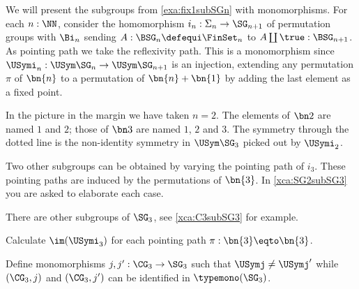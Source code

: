 \begin{example}
  \label{ex:SGninSGn+1}
We will present the subgroups from \cref{exa:fix1subSGn} with
monomorphisms. For each $n:\NN$, consider the  homomorphism 
$i_n:\Sigma_n\to\SG_{n+1}$ of permutation groups
with $\Bi_n$ sending $A:\BSG_n\defequi \FinSet_n$ to $A\coprod\true:\BSG_{n+1}$.
As pointing path we take the reflexivity path.
This is a monomorphism since $\USymi_n:\USym\SG_n\to\USym\SG_{n+1}$ 
is an injection, extending any permutation $\pi$ of $\bn{n}$ to 
a permutation of $\bn{n}+\bn{1}$ by adding the last element as a
fixed point.

In the picture in the margin we have taken $n=2$. The elements of $\bn 2$ are
named $1$ and $2$; those of $\bn 3$ are named $1$, $2$ and $3$. The symmetry
through the dotted line is the non-identity symmetry in $\USym\SG_3$ picked out
by $\USymi_2$.

Two other subgroups can be obtained by varying the pointing path of
$i_3$. These pointing paths are induced by the permutations of $\bn{3}$. In
\cref{xca:SG2subSG3} you are asked to elaborate each case.

There are other subgroups of $\SG_3$, see \cref{xca:C3subSG3} for example.
\end{example}

\begin{xca}\label{xca:SG2subSG3}
Calculate $\im(\USymi_3)$ for each pointing path $\pi:\bn{3}\eqto\bn{3}$.
\end{xca}

\begin{xca}\label{xca:C3subSG3}
Define monomorphisms $j,j':\CG_3\to\SG_3$ such that $\USymj\neq \USymj'$
while $(\CG_3,j)$ and $(\CG_3,j')$ can be identified in $\typemono(\SG_3)$.
\end{xca}

